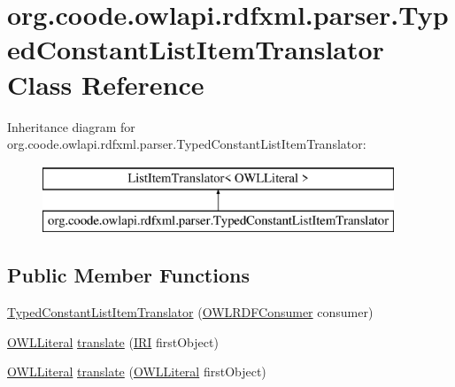\hypertarget{classorg_1_1coode_1_1owlapi_1_1rdfxml_1_1parser_1_1_typed_constant_list_item_translator}{\section{org.\-coode.\-owlapi.\-rdfxml.\-parser.\-Typed\-Constant\-List\-Item\-Translator Class Reference}
\label{classorg_1_1coode_1_1owlapi_1_1rdfxml_1_1parser_1_1_typed_constant_list_item_translator}
}
Inheritance diagram for org.\-coode.\-owlapi.\-rdfxml.\-parser.\-Typed\-Constant\-List\-Item\-Translator\-:\begin{figure}[H]
\begin{center}
\leavevmode
\includegraphics[height=2.000000cm]{classorg_1_1coode_1_1owlapi_1_1rdfxml_1_1parser_1_1_typed_constant_list_item_translator}
\end{center}
\end{figure}
\subsection*{Public Member Functions}
\begin{DoxyCompactItemize}
\item 
\hyperlink{classorg_1_1coode_1_1owlapi_1_1rdfxml_1_1parser_1_1_typed_constant_list_item_translator_a5d5ec4df5a00ccbfd32507590df6e828}{Typed\-Constant\-List\-Item\-Translator} (\hyperlink{classorg_1_1coode_1_1owlapi_1_1rdfxml_1_1parser_1_1_o_w_l_r_d_f_consumer}{O\-W\-L\-R\-D\-F\-Consumer} consumer)
\item 
\hyperlink{interfaceorg_1_1semanticweb_1_1owlapi_1_1model_1_1_o_w_l_literal}{O\-W\-L\-Literal} \hyperlink{classorg_1_1coode_1_1owlapi_1_1rdfxml_1_1parser_1_1_typed_constant_list_item_translator_a6b4fde46900a320a26699aeacb7580b8}{translate} (\hyperlink{classorg_1_1semanticweb_1_1owlapi_1_1model_1_1_i_r_i}{I\-R\-I} first\-Object)
\item 
\hyperlink{interfaceorg_1_1semanticweb_1_1owlapi_1_1model_1_1_o_w_l_literal}{O\-W\-L\-Literal} \hyperlink{classorg_1_1coode_1_1owlapi_1_1rdfxml_1_1parser_1_1_typed_constant_list_item_translator_aa878996d54fe0a3044c041beb5d7dc95}{translate} (\hyperlink{interfaceorg_1_1semanticweb_1_1owlapi_1_1model_1_1_o_w_l_literal}{O\-W\-L\-Literal} first\-Object)
\end{DoxyCompactItemize}
